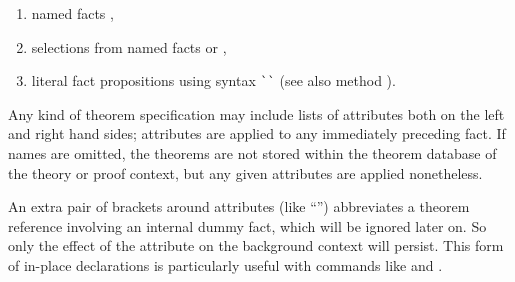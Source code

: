 \begin{isabellebody}
\begin{isamarkuptext}
\begin{enumerate}
  \item named facts ,

  \item selections from named facts  or ,

  \item literal fact propositions using \hyperlink{syntax.altstring}{\mbox{}} syntax
  \verb|`|\verb|`| (see also method
  \hyperlink{method.fact}{\mbox{}}).

  \end{enumerate}

  Any kind of theorem specification may include lists of attributes
  both on the left and right hand sides; attributes are applied to any
  immediately preceding fact.  If names are omitted, the theorems are
  not stored within the theorem database of the theory or proof
  context, but any given attributes are applied nonetheless.

  An extra pair of brackets around attributes (like ``'') abbreviates a theorem reference involving an
  internal dummy fact, which will be ignored later on.  So only the
  effect of the attribute on the background context will persist.
  This form of in-place declarations is particularly useful with
  commands like \hyperlink{command.declare}{\mbox{}} and \hyperlink{command.using}{\mbox{}}.


\end{isamarkuptext}
\end{isabellebody}

